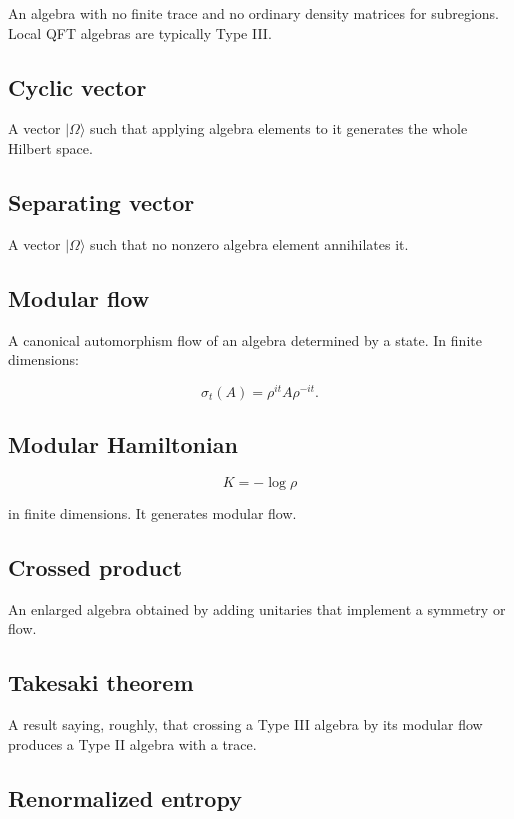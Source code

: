 \documentclass[11pt,a4paper]{article}
\begin{document}
An algebra with no finite trace and no ordinary density matrices for subregions. Local QFT algebras are typically Type III.

\subsection{Cyclic vector}

A vector $|\Omega\rangle$ such that applying algebra elements to it generates the whole Hilbert space.

\subsection{Separating vector}

A vector $|\Omega\rangle$ such that no nonzero algebra element annihilates it.

\subsection{Modular flow}

A canonical automorphism flow of an algebra determined by a state. In finite dimensions:

\[
\sigma_t(A)=\rho^{it}A\rho^{-it}.
\]

\subsection{Modular Hamiltonian}

\[
K=-\log\rho
\]

in finite dimensions. It generates modular flow.

\subsection{Crossed product}

An enlarged algebra obtained by adding unitaries that implement a symmetry or flow.

\subsection{Takesaki theorem}

A result saying, roughly, that crossing a Type III algebra by its modular flow produces a Type II algebra with a trace.

\subsection{Renormalized entropy}
\end{document}
